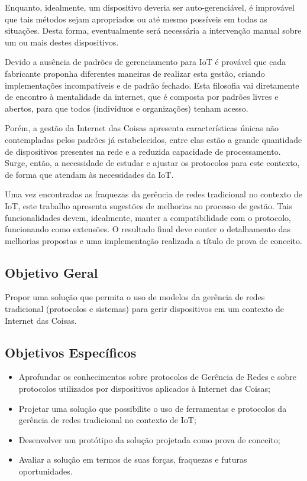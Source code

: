 \documentclass[twoside,english,brazilian]{UNISINOSmonografia}
\begin{document}
	Enquanto, idealmente, um 
	dispositivo deveria ser auto-gerenciável, é improvável que tais métodos 
	sejam apropriados ou até mesmo possíveis em todas as situações. Desta 
	forma, eventualmente será 
	necessária a intervenção manual sobre um ou mais destes dispositivos.

	Devido a ausência de padrões de gerenciamento para IoT é provável que cada 
	fabricante 
	proponha diferentes maneiras de realizar esta gestão, criando 
	implementações 
	incompatíveis e de padrão fechado. Esta filosofia vai diretamente 
	de encontro à mentalidade da internet, que é composta por padrões livres e 
	abertos,
	para que todos (indivíduos e organizações) tenham acesso.

	Porém, a gestão da Internet das Coisas apresenta características únicas 
	não contempladas pelos padrões já estabelecidos, entre elas estão a grande 
	quantidade de dispositivos presentes na rede e a reduzida capacidade de 
	processamento. Surge, então, a necessidade de estudar e ajustar os 
	protocolos para este contexto, de forma que atendam às necessidades da IoT.

	Uma vez encontradas as fraquezas da gerência de redes tradicional no 
	contexto de IoT, este trabalho apresenta sugestões de melhorias ao 
	processo de gestão.
	Tais funcionalidades devem, idealmente, manter a compatibilidade com o 
	protocolo, funcionando como extensões. 
	O resultado final deve conter o detalhamento das melhorias propostas e uma 
	implementação realizada a título de prova de conceito.

\subsection{Objetivo Geral}

Propor uma solução que permita o uso de modelos da gerência de 
redes tradicional (protocolos e sistemas) para gerir dispositivos em um 
contexto de Internet das Coisas.

\subsection{Objetivos Específicos}
	\begin{itemize}
		\item 
		Aprofundar os conhecimentos sobre protocolos de Gerência de 
		Redes e sobre protocolos utilizados por dispositivos aplicados 
		à Internet das Coisas;
		
		\item
		Projetar uma solução que possibilite o uso de ferramentas e protocolos 
		da gerência de redes tradicional no contexto de IoT;
		
		\item
		Desenvolver um protótipo da solução projetada como prova de conceito;

		\item
		Avaliar a solução em termos de suas forças, fraquezas e futuras 
		oportunidades.
		
	\end{itemize}
\end{document}
